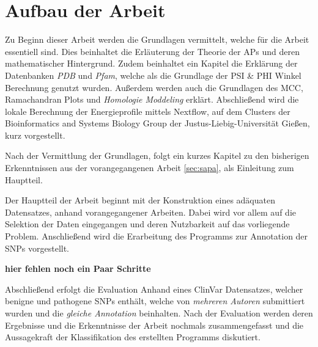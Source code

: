 \section{Aufbau der Arbeit}

Zu Beginn dieser Arbeit werden die Grundlagen vermittelt, welche für die Arbeit essentiell sind. Dies beinhaltet die Erläuterung der Theorie der \ac{APs} und deren mathematischer Hintergrund. Zudem beinhaltet ein Kapitel die Erklärung der Datenbanken \emph{PDB} und \emph{Pfam}, welche als die Grundlage der PSI \& PHI Winkel Berechnung genutzt wurden. Außerdem werden auch die Grundlagen des \ac{MCC}, Ramachandran Plots und \emph{Homologie Moddeling} 
erklärt. Abschließend wird die lokale Berechnung der Energieprofile mittels Nextflow, auf dem Clusters der Bioinformatics and Systems Biology Group der Justus-Liebig-Universität Gießen, kurz vorgestellt.

Nach der Vermittlung der Grundlagen, folgt ein kurzes Kapitel zu den bisherigen Erkenntnissen aus der vorangegangenen Arbeit \ref{sec:sapa}, als Einleitung zum Hauptteil.

Der Hauptteil der Arbeit beginnt mit der Konstruktion eines adäquaten Datensatzes, anhand vorangegangener Arbeiten\cite{Mathias.2014}. Dabei wird vor allem auf die Selektion der Daten eingegangen und deren Nutzbarkeit auf das vorliegende Problem. Anschließend wird die Erarbeitung des Programms zur Annotation der \ac{SNPs} vorgestellt.

\textbf{hier fehlen noch ein Paar Schritte}

Abschließend erfolgt die Evaluation Anhand eines ClinVar Datensatzes, welcher benigne und pathogene \ac{SNPs} enthält, welche von \emph{mehreren Autoren} submittiert wurden und die \emph{gleiche Annotation} beinhalten. Nach der Evaluation werden deren Ergebnisse und die Erkenntnisse der Arbeit nochmals zusammengefasst und die Aussagekraft der Klassifikation des erstellten Programms diskutiert.

